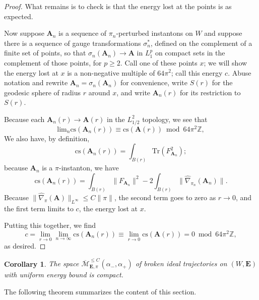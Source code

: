 \documentclass[10pt,a4paper]{amsart}
\newtheorem{corollary}[theorem]{Corollary}
\theoremstyle{definition}
\theoremstyle{remark}
\numberwithin{figure}{qchap}
\begin{document}
\begin{proof}
What remains is to check is that the energy lost at the points is as expected.

Now suppose $\mathbf{A}_n$ is a sequence of $\pi_n$-perturbed instantons on $W$ and suppose there is a sequence of gauge transformations $\sigma_n^*$, defined on the complement of a finite set of points, so that $\sigma_n(\mathbf{A}_n) \to \mathbf{A}$ in $L^p_1$ on compact sets in the complement of those points, for $p \geq 2$. Call one of these points $x$; we will show the energy lost at $x$ is a non-negative multiple of $64\pi^2$; call this energy $c$. Abuse notation and rewrite $\mathbf{A}_n = \sigma_n(\mathbf{A}_n)$ for convenience, write $S(r)$ for the geodesic sphere of radius $r$ around $x$, and write $\mathbf{A}_n(r)$ for its restriction to $S(r)$. 

Because each $\mathbf{A}_n(r) \to \mathbf{A}(r)$ in the $L^2_{1/2}$ topology, we see that 
$$\text{lim}_n \text{cs}(\mathbf{A}_n(r)) \equiv \text{cs}(\mathbf{A}(r)) \bmod 64\pi^2 \mathbb Z,$$ 
We also have, by definition, 
$$\text{cs}(\mathbf{A}_n(r)) = \int_{B(r)} \text{Tr}\left(F_{\mathbf{A}_n}^2\right);$$ 
because $\mathbf{A}_n$ is a $\pi$-instanton, we have 
$$\text{cs}(\mathbf{A}_n(r)) = \int_{B(r)} \|F_{\mathbf{A}_n}\|^2 -2\int_{B(r)} \|\widehat{\nabla}_{\pi_n}(\mathbf{A}_n)\|.$$ 
Because $\|\widehat{\nabla}_\pi(\mathbf{A})\|_{L^\infty} \leq C\|\pi\|$, the second term goes to zero as $r \to 0$, and the first term limits to $c$, the energy lost at $x$. 

Putting this together, we find 
$$c = \lim_{r \to 0} \lim_{n \to \infty} \text{cs}(\mathbf{A}_n(r)) \equiv \lim_{r \to 0} \text{cs}(\mathbf{A}(r)) = 0 \bmod 64\pi^2 \mathbb Z,$$
as desired. 
\end{proof}

\begin{corollary}The space $\overline{\mathcal M}^{\leq C}_{\mathbf{E},\pi}(\alpha_-, \alpha_+)$ of broken ideal trajectories on $(W,\mathbf{E})$ with uniform energy bound is compact.
\end{corollary}

The following theorem summarizes the content of this section. 
\end{document}
